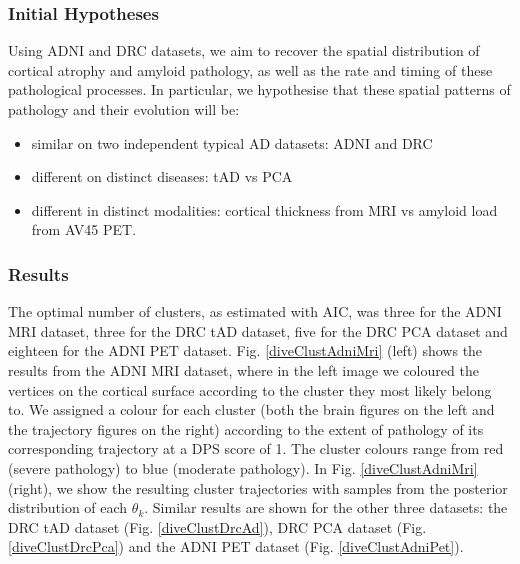 \subsubsection{Initial Hypotheses}

Using ADNI and DRC datasets, we aim to recover the spatial distribution of cortical atrophy and amyloid pathology, as well as the rate and timing of these pathological processes. In particular, we hypothesise that these spatial patterns of pathology and their evolution will be: 
\begin{itemize}
 \item similar on two independent typical AD datasets: ADNI and DRC
 \item different on distinct diseases: tAD vs PCA 
 \item different in distinct modalities: cortical thickness from MRI vs amyloid load from AV45 PET.
\end{itemize}

\subsubsection{Results}

The optimal number of clusters, as estimated with AIC, was three for the ADNI MRI dataset, three for the DRC tAD dataset, five for the DRC PCA dataset and eighteen for the ADNI PET dataset. Fig. \ref{diveClustAdniMri} (left) shows the results from the ADNI MRI dataset, where in the left image we coloured the vertices on the cortical surface according to the cluster they most likely belong to. We assigned a colour for each cluster (both the brain figures on the left and the trajectory figures on the right) according to the extent of pathology of its corresponding trajectory at a DPS score of 1. The cluster colours range from red (severe pathology) to blue (moderate pathology). In Fig. \ref{diveClustAdniMri} (right), we show the resulting cluster trajectories with samples from the posterior distribution of each $\theta_k$. Similar results are shown for the other three datasets: the DRC tAD dataset (Fig. \ref{diveClustDrcAd}), DRC PCA dataset (Fig. \ref{diveClustDrcPca}) and the ADNI PET dataset (Fig. \ref{diveClustAdniPet}).


